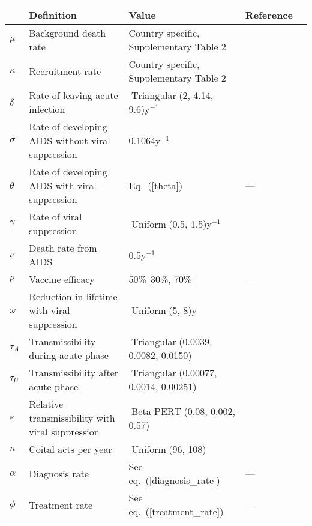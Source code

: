 \documentclass{article}
\DeclareMathOperator{\Uniform}{Uniform}
\DeclareMathOperator{\Triangular}{Triangular}
\DeclareMathOperator{\BetaPERT}{Beta-PERT}
\begin{document}
\begin{table}
  \begin{center}
    \begin{tabularx}{\textwidth}{lXlll}
      \hline
      & Definition & Value & Reference \\
      \hline
      $\mu$ & Background death rate
      & Country specific, Supplementary Table 2
      & \autocite{World_Development_Indicators2013-ee} \\
      $\kappa$ & Recruitment rate
      & Country specific, Supplementary Table 2
      & \autocite{World_Development_Indicators2013-ee, WorldBankpg} \\
      $\delta$	& Rate of leaving acute infection
      & $\Triangular$(2, 4.14, 9.6)\;y$^{-1}$
      & \autocite{Hollingsworth2008-iy} \\
      $\sigma$	& Rate of developing AIDS without viral suppression
      & 0.1064\;y$^{-1}$ & \autocite{Morgan2002-cq} \\
      $\theta$ & Rate of developing AIDS with viral suppression
      & Eq.~(\ref{theta}) & --- \\
      $\gamma$ & Rate of viral suppression
      & $\Uniform$(0.5, 1.5)\;y$^{-1}$
      & \autocite{Currie2009-yz} \\
      $\nu$ & Death rate from AIDS & 0.5\;y$^{-1}$
      & \autocite{Morgan2002-cq} \\
      $\rho$ & Vaccine efficacy & 50\%\,[30\%, 70\%] & --- \\
      $\omega$	& Reduction in lifetime with viral suppression
      & $\Uniform$(5, 8)\;y
      & \autocite{Samji2013-kf, Unaids2014-ue} \\
      $\tau_{A}$ & Transmissibility during acute phase
      & $\Triangular$(0.0039, 0.0082, 0.0150)
      & \autocite{Wawer2005-us, Skarbinski2015-ni}\\
      $\tau_{U}$ & Transmissibility after acute phase
      & $\Triangular$(0.00077, 0.0014, 0.00251)
      & \autocite{Hughes2012-so} \\
      $\varepsilon$ & Relative transmissibility with
      viral suppression & $\BetaPERT$(0.08, 0.002, 0.57)
      & \autocite{Donnell2010-xo, attia_2009, wilson_2012, jia_2013,
        rodger_2016} \\
      $n$ & Coital acts per year & $\Uniform$(96, 108)
      & \autocite{Wawer2005-us, Abdool_Karim2010-cm}\\
      $\alpha$ & Diagnosis rate & See eq.~(\ref{diagnosis_rate}) & --- \\
      $\phi$ & Treatment rate & See eq.~(\ref{treatment_rate}) & --- \\

\end{tabularx}
\end{center}
\end{table}
\end{document}
